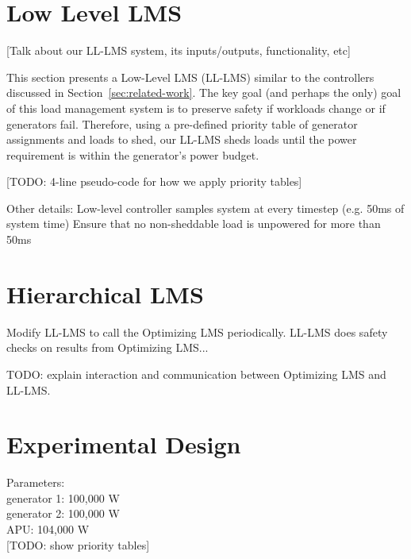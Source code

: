 \documentclass{acm_proc_article-sp}
\begin{document}
\section{Low Level LMS}
[Talk about our LL-LMS system, its inputs/outputs, functionality, etc]

This section presents a Low-Level LMS (LL-LMS) similar to the controllers discussed in Section~\ref{sec:related-work}.
The key goal (and perhaps the only) goal of this load management system is to preserve safety if workloads change or if  generators fail.
Therefore, using a pre-defined priority table of generator assignments and loads to shed, our LL-LMS sheds loads until the power requirement is within the generator's power budget.

[TODO: 4-line pseudo-code for how we apply priority tables]

Other details:
Low-level controller samples system at every  timestep (e.g. 50ms of system time) 
Ensure that no non-sheddable load is unpowered for more  than 50ms 

\section{Hierarchical LMS}
Modify LL-LMS to call the Optimizing LMS periodically.
LL-LMS does safety checks on results from Optimizing LMS...

TODO: explain interaction and communication between Optimizing LMS and LL-LMS.

\section{Experimental Design}

Parameters: \\
generator 1: 100,000 W \\
generator 2: 100,000 W \\
APU: 104,000 W \\

[TODO: show priority tables]
\end{document}
